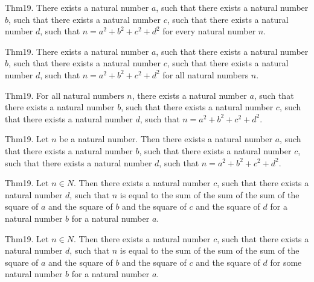 \documentclass{article}
\begin{document}
Thm19. There exists a natural number $a$, such that there exists a natural number $b$, such that there exists a natural number $c$, such that there exists a natural number $d$, such that $n = a ^{ 2}+ b ^{ 2}+ c ^{ 2}+ d ^{ 2}$ for every natural number $n$.

Thm19. There exists a natural number $a$, such that there exists a natural number $b$, such that there exists a natural number $c$, such that there exists a natural number $d$, such that $n = a ^{ 2}+ b ^{ 2}+ c ^{ 2}+ d ^{ 2}$ for all natural numbers $n$.

Thm19. For all natural numbers $n$, there exists a natural number $a$, such that there exists a natural number $b$, such that there exists a natural number $c$, such that there exists a natural number $d$, such that $n = a ^{ 2}+ b ^{ 2}+ c ^{ 2}+ d ^{ 2}$.

Thm19. Let $n$ be a natural number. Then there exists a natural number $a$, such that there exists a natural number $b$, such that there exists a natural number $c$, such that there exists a natural number $d$, such that $n = a ^{ 2}+ b ^{ 2}+ c ^{ 2}+ d ^{ 2}$.

Thm19. Let $n \in N$. Then there exists a natural number $c$, such that there exists a natural number $d$, such that $n$ is equal to the sum of the sum of the sum of the square of $a$ and the square of $b$ and the square of $c$ and the square of $d$ for a natural number $b$ for a natural number $a$.

Thm19. Let $n \in N$. Then there exists a natural number $c$, such that there exists a natural number $d$, such that $n$ is equal to the sum of the sum of the sum of the square of $a$ and the square of $b$ and the square of $c$ and the square of $d$ for some natural number $b$ for a natural number $a$.
\end{document}
